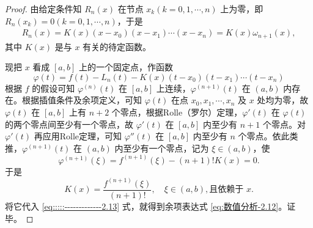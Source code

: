\documentclass[../../main.tex]{subfiles}%
\begin{document}
\begin{proof}
由给定条件知 $R_n(x)$ 在节点 $x_k (k = 0, 1, \cdots, n)$ 上为零，即 $R_n(x_k) = 0 (k = 0, 1, \cdots, n)$，于是 
\begin{align}
R_n(x) = K(x)(x - x_0)(x - x_1) \cdots (x - x_n) = K(x) \omega_{n + 1}(x),\label{eq:::::-------------2.13}
\end{align}
其中 $K(x)$ 是与 $x$ 有关的待定函数。

现把 $x$ 看成 $[a, b]$ 上的一个固定点，作函数 
\[
\varphi(t) = f(t) - L_n(t) - K(x)(t - x_0)(t - x_1) \cdots (t - x_n)
\]
根据 $f$ 的假设可知 $\varphi^{(n)}(t)$ 在 $[a, b]$ 上连续，$\varphi^{(n + 1)}(t)$ 在 $(a, b)$ 内存在。根据插值条件及余项定义，可知 $\varphi(t)$ 在点 $x_0, x_1, \cdots, x_n$ 及 $x$ 处均为零，故 $\varphi(t)$ 在 $[a, b]$ 上有 $n + 2$ 个零点，根据Rolle（罗尔）定理，$\varphi'(t)$ 在 $\varphi(t)$ 的两个零点间至少有一个零点，故 $\varphi'(t)$ 在 $[a, b]$ 内至少有 $n + 1$ 个零点。对 $\varphi'(t)$ 再应用Rolle定理，可知 $\varphi''(t)$ 在 $[a, b]$ 内至少有 $n$ 个零点。依此类推，$\varphi^{(n + 1)}(t)$ 在 $(a, b)$ 内至少有一个零点，记为 $\xi \in (a, b)$，使 
\[
\varphi^{(n + 1)}(\xi) = f^{(n + 1)}(\xi) - (n + 1)! K(x) = 0.
\]
于是 
\[
K(x) = \frac{f^{(n + 1)}(\xi)}{(n + 1)!}, \quad \xi \in (a, b), \text{且依赖于 } x.
\]
将它代入 \eqref{eq:::::-------------2.13} 式，就得到余项表达式 \eqref{eq:数值分析-2.12}。证毕。

\end{proof}
\end{document}
